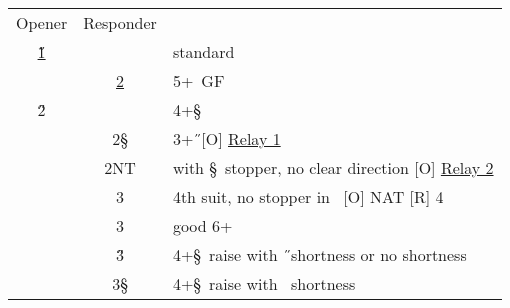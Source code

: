 \hypertarget{1h2d2h}{}
\begin{longtable}{C{\bidlength} C{\bidlength} | l}
Opener & Responder \\
\hyperlink{1h}{1\H} & & standard \\
& \hyperlink{1h2c}{2\D} & 5+\D\ GF \\
2\H & & 4+\S \\
\hline\hline
& 2\S & 3+\H\ [O] \hyperlink{1h2c2dR1}{Relay 1}\\
& 2NT & with \S\ stopper, no clear direction [O] \hyperlink{1h2c2dR2}{Relay 2}\\
& 3\C & 4th suit, no stopper in \C\ [O] NAT [R] 4\D \\
& 3\D & good 6+\D \\
& 3\H & 4+\S\ raise with \H\ shortness or no shortness \\
& 3\S & 4+\S\ raise with \D\ shortness \\
\end{longtable}
